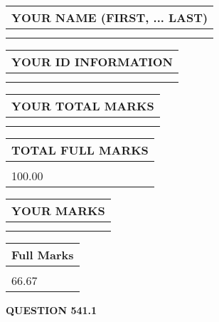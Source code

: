 \documentclass{ctexart}
\begin{document}
   
   
   
\newpage 
\setcounter{page}{ 
   541001 } 
   
   
   
   
\noindent\begin{tabular}{|l|}
\hline
YOUR NAME (FIRST, ... LAST)  \\
\hline
 \\ 
 \\ 
\hline
\end{tabular}
\hspace{0.05in} \begin{tabular}{|l|}
\hline
 YOUR   ID   INFORMATION  \\
\hline
 \\ 
 \\ 
\hline
\end{tabular}
   
   
\vspace{0.2in}\noindent\begin{tabular}{|l|}
\hline
YOUR TOTAL MARKS  \\
\hline
 \\ 
 \\ 
\hline
\end{tabular}
\hspace{0.05in} \begin{tabular}{|l|}
\hline
TOTAL FULL MARKS  \\
\hline
 \\ 
100.00 \\
\hline
\end{tabular}
   
   
 \vspace{0.2in}
 
 
 
 
   
   
  
\vspace{0.2in}
  
\noindent\begin{tabular}{|l|}
\hline
 YOUR MARKS  \\
\hline
 \\ 
 \\ 
\hline
\end{tabular}
\hspace{0.05in} \begin{tabular}{|l|}
\hline
 Full Marks  \\
\hline
 \\ 
66.67 \\
\hline
\end{tabular}
{\textbf{\Large{QUESTION
541.1 
}}}
  
\end{document}
